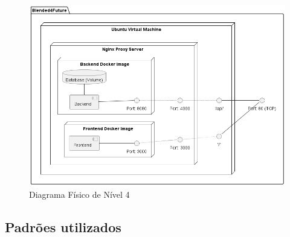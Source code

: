\begin{figure}[h!tbp]
    \centering
    \includegraphics[width=\linewidth]{capitulos/cap3-analisedoproblema/assets/arquiteturasistema/physical/physical_l4.png}
    \caption{Diagrama Físico de Nível 4}
    \label{fig:diagram-lvl4-physical}
\end{figure}



\subsection{Padrões utilizados}
